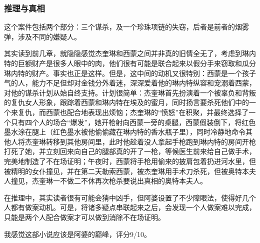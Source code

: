\subsubsection{推理与真相}
这个案件包括两个部分：三个谋杀，及一个珍珠项链的失窃，后者是前者的烟雾弹，涉及不同的嫌疑人。

其实读到前几章，就隐隐感觉杰奎琳和西蒙之间并非真的旧情全无了，考虑到琳内特的巨额财产是很多人眼中的肉，他们很有可能是联合起来以假分手来窃取和瓜分琳内特的财产。事实也正是这样。但是，这中间的动机又很特别：西蒙是一个孩子气的人，能力不足但却对金钱分外着迷，深深爱着他的琳内特纵容和宠溺着西蒙，对他的谋杀计划从始自终支持。计划很简单：杰奎琳首先扮演着一个被辜负和背叛的复仇女人形象，跟踪着西蒙和琳内特在埃及的蜜月，同时扬言要杀死他们中的一个来复仇，而西蒙也配合地表现出烦恼；杰奎琳的“愤怒”在积聚，并最终选择了一个只有四个人的场合“爆发”，她开枪射向西蒙一旁的桌腿，西蒙假装倒下，将红色墨水涂在腿上（红色墨水被他偷偷藏在琳内特的香水瓶子里），同时冷静地命令其他人将杰奎琳转移到其他房间里，此时他趁着没人拿起手枪跑到琳内特的房间开枪打死了她，并立刻回来向自己的腿部真的开了一枪，等候医生前来给自己做手术，完美地制造了不在场证明；午夜时，西蒙将手枪用偷来的披肩包着扔进河水里，但被精明的女仆撞见，并在第二天勒索西蒙，被杰奎琳用手术刀杀死，但被奥特本夫人撞见，杰奎琳一不做二不休再次枪杀要说出真相的奥特本夫人。

在推理中，其实读者很有可能会猜中凶手，但阿婆设置了不少障眼法，使得好几个人都有做案动机。可是，将诸多疑点串联起来之后，会发现一个人做案难以完成，只能是两个人配合做案才可以做到消除不在场证明。

我感觉这部小说应该是阿婆的巅峰，评分9/10。
